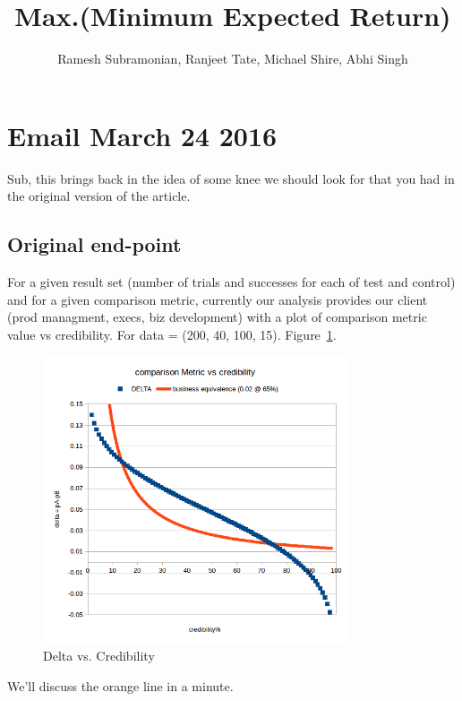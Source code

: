 \documentclass[letterpaper,12pt]{article}
\begin{document}
\title{Max.(Minimum Expected Return)}
\author{Ramesh Subramonian, Ranjeet Tate, Michael Shire, Abhi Singh}
\maketitle
\thispagestyle{fancy}
\lhead{}
\chead{}
\rhead{}
\lfoot{}

\section{Email March 24 2016}
\label{sec:intro}
Sub, this brings back in the idea of some knee we should look for that
you had in the original version of the article.

\subsection{Original end-point}
For a given result set (number of trials and successes for each of
test and control) and for a given comparison metric, currently our
analysis provides our client (prod managment, execs, biz development)
with a plot of comparison metric value vs credibility. For data =
(200, 40, 100, 15).  Figure~\ref{fig:delta_vs_cred}.
\begin{figure}[ht!]
\centering
\includegraphics[width=90mm]{delta_vs_cred}
\caption{Delta vs. Credibility \label{fig:delta_vs_cred}}
\end{figure}
We'll discuss the orange line in a minute.
\end{document}
